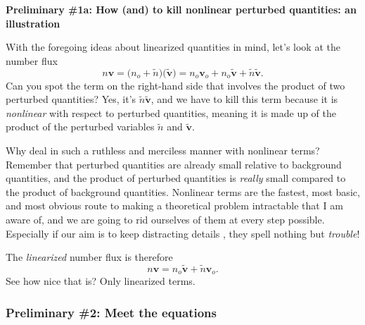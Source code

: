 \textbf{Preliminary \#1a:  How (and) to kill nonlinear perturbed quantities: an illustration}

With the foregoing ideas about linearized quantities in mind, let's look at the
number flux
\begin{equation}
  n \mathbf{v} = \Big ( n_o + \tilde n \Big ) \Big ( \mathbf{\tilde v} \Big ) = n_o \mathbf{v}_o + n_o \mathbf{\tilde v} + \tilde n \mathbf{\tilde v}.
\end{equation}
Can you spot the term on the right-hand side that involves the product of two
perturbed quantities? Yes, it's $\tilde n \mathbf{\tilde v}$, and we have to
kill this term because it is \emph{nonlinear} with respect to perturbed
quantities, meaning it is made up of the product of the perturbed variables
$\tilde n$ and $\mathbf{\tilde v}$.

Why deal in such a ruthless and merciless manner with nonlinear terms? Remember
that perturbed quantities are already small relative to background quantities,
and the product of perturbed quantities is \emph{really} small compared to the
product of background quantities. Nonlinear terms are the fastest, most basic,
and most obvious route to making a theoretical problem intractable that I am
aware of, and we are going to rid ourselves of them at every step
possible. Especially if our aim is to keep distracting details , they spell
nothing but \emph{trouble}!

The \emph{linearized} number flux is therefore
\begin{equation}
  n \mathbf{v} = n_o \mathbf{\tilde v} + \tilde n \mathbf{v}_o.
\end{equation}
See how nice that is? Only linearized terms.

\subsubsection{Preliminary \#2: Meet the equations}

